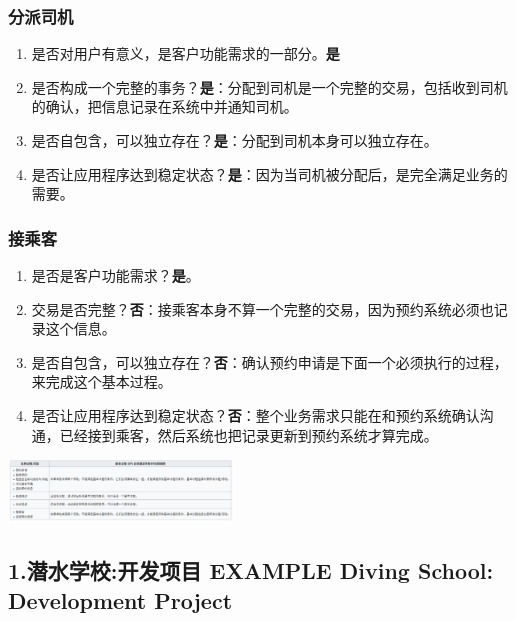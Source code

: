 \hypertarget{ux5206ux6d3eux53f8ux673a}{%
\subsubsection{分派司机}\label{ux5206ux6d3eux53f8ux673a}}

\begin{enumerate}
\tightlist
\item
  是否对用户有意义，是客户功能需求的一部分。\textbf{是}
\item
  是否构成一个完整的事务？\textbf{是}：分配到司机是一个完整的交易，包括收到司机的确认，把信息记录在系统中并通知司机。
\item
  是否自包含，可以独立存在？\textbf{是}：分配到司机本身可以独立存在。
\item
  是否让应用程序达到稳定状态？\textbf{是}：因为当司机被分配后，是完全满足业务的需要。
\end{enumerate}

\hypertarget{ux63a5ux4e58ux5ba2}{%
\subsubsection{接乘客}\label{ux63a5ux4e58ux5ba2}}

\begin{enumerate}
\tightlist
\item
  是否是客户功能需求？\textbf{是}。
\item
  交易是否完整？\textbf{否}：接乘客本身不算一个完整的交易，因为预约系统必须也记录这个信息。
\item
  是否自包含，可以独立存在？\textbf{否}：确认预约申请是下面一个必须执行的过程，来完成这个基本过程。
\item
  是否让应用程序达到稳定状态？\textbf{否}：整个业务需求只能在和预约系统确认沟通，已经接到乘客，然后系统也把记录更新到预约系统才算完成。
\end{enumerate}

\includegraphics[width=6cm]{Screenshotfrom2023-11-1302-05-21.png}

\hypertarget{ux6f5cux6c34ux5b66ux6821ux5f00ux53d1ux9879ux76ee-example-diving-school-development-project}{%
\subsection{1.潜水学校:开发项目 EXAMPLE Diving School: Development
Project}\label{ux6f5cux6c34ux5b66ux6821ux5f00ux53d1ux9879ux76ee-example-diving-school-development-project}}

